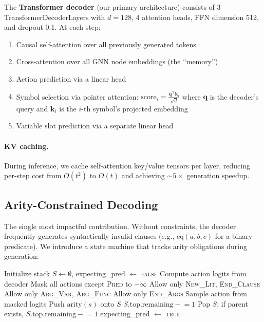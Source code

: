 \documentclass{article}
\begin{document}
The \textbf{Transformer decoder} (our primary architecture) consists of 3
TransformerDecoderLayers with $d{=}128$, 4 attention heads, FFN dimension 512,
and dropout 0.1. At each step:
\begin{enumerate}
\item Causal self-attention over all previously generated tokens
\item Cross-attention over all GNN node embeddings (the ``memory'')
\item Action prediction via a linear head
\item Symbol selection via pointer attention:
      $\text{score}_i = \frac{\mathbf{q}^\top \mathbf{k}_i}{\sqrt{d}}$
      where $\mathbf{q}$ is the decoder's query and $\mathbf{k}_i$ is the
      $i$-th symbol's projected embedding
\item Variable slot prediction via a separate linear head
\end{enumerate}

\paragraph{KV caching.} During inference, we cache self-attention key/value
tensors per layer, reducing per-step cost from $O(t^2)$ to $O(t)$ and achieving
${\sim}5\times$ generation speedup.

\subsection{Arity-Constrained Decoding}
\label{sec:arity}

The single most impactful contribution. Without constraints, the decoder frequently
generates syntactically invalid clauses (e.g., $\text{eq}(a,b,c)$ for a binary
predicate). We introduce a state machine that tracks arity obligations during
generation:

\begin{algorithm}[t]
\caption{Arity-Constrained Decoding}
\label{alg:arity}
\begin{algorithmic}[1]
\STATE Initialize stack $S \leftarrow \emptyset$, expecting\_pred $\leftarrow$ \textsc{false}
    \STATE Compute action logits from decoder
        \STATE Mask all actions except \textsc{Pred} to $-\infty$
        \STATE Allow only \textsc{New\_Lit}, \textsc{End\_Clause}
        \STATE Allow only \textsc{Arg\_Var}, \textsc{Arg\_Func}
        \STATE Allow only \textsc{End\_Args}
    \ENDIF
    \STATE Sample action from masked logits
        \STATE Push $\text{arity}(s)$ onto $S$
        \STATE $S.\text{top.remaining} \mathrel{-}= 1$
        \STATE Pop $S$; if parent exists, $S.\text{top.remaining} \mathrel{-}= 1$
        \STATE expecting\_pred $\leftarrow$ \textsc{true}
    \ENDIF
\ENDFOR
\end{algorithmic}
\end{algorithm}
\end{document}
